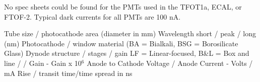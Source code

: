             \begin{table}[H]
                \centering
            \end{table} 
            
            No spec sheets could be found for the PMTs used in the TFOT1a, ECAL, or FTOF-2.
            Typical dark currents for all PMTs are 100 nA. 
        
            
            Tube size / photocathode area (diameter in mm)
            Wavelength short / peak / long (nm)
            Photocathode / window material (BA = Bialkali, BSG = Borosilicate Glass)
            Dynode structure / stages / gain  LF = Linear-focused, B\&L = Box and line / / Gain - Gain x 10$^6$
            Anode to Cathode Voltage / Anode Current  - Volts / mA
            Rise / transit time/time spread in ns
            
